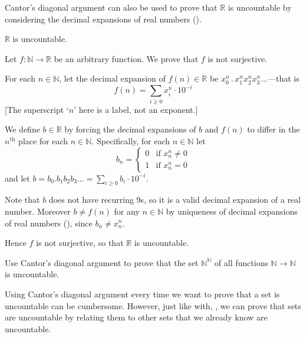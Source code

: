 
Cantor's diagonal argument can also be used to prove that $\mathbb{R}$ is uncountable by considering the decimal expansions of real numbers ().

\begin{theorem}
\label{thmRIsUncountable}
$\mathbb{R}$ is uncountable.
\end{theorem}

\begin{cproof}
Let $f : \mathbb{N} \to \mathbb{R}$ be an arbitrary function. We prove that $f$ is not surjective.

For each $n \in \mathbb{N}$, let the decimal expansion of $f(n) \in \mathbb{R}$ be $x_0^n \,.\, x_1^n x_2^n x_3^n \dots$---that is
\[ f(n) = \sum_{i \ge 0} x_i^n \cdot 10^{-i} \]
[The superscript `$n$' here is a label, not an exponent.]

We define $b \in \mathbb{R}$ by forcing the decimal expansions of $b$ and $f(n)$ to differ in the $n^{\text{th}}$ place for each $n \in \mathbb{N}$. Specifically, for each $n \in \mathbb{N}$ let
\[ b_n = \begin{cases} 0 & \text{if } x_n^n \ne 0 \\ 1 & \text{if } x_n^n = 0 \end{cases} \]
and let $b = b_0. b_1 b_2 b_3 \dots{} = \sum_{i \ge 0} b_i \cdot 10^{-i}$.

Note that $b$ does not have recurring 9s, so it is a valid decimal expansion of a real number. Moreover $b \ne f(n)$ for any $n \in \mathbb{N}$ by uniqueness of decimal expansions of real numbers (), since $b_n \ne x_n^n$.

Hence $f$ is not surjective, so that $\mathbb{R}$ is uncountable.
\end{cproof}

\begin{exercise}
Use Cantor's diagonal argument to prove that the set $\mathbb{N}^{\mathbb{N}}$ of all functions $\mathbb{N} \to \mathbb{N}$ is uncountable.
\end{exercise}

Using Cantor's diagonal argument every time we want to prove that a set is uncountable can be cumbersome. However, just like with, , we can prove that sets are uncountable by relating them to other sets that we already know are uncountable.

